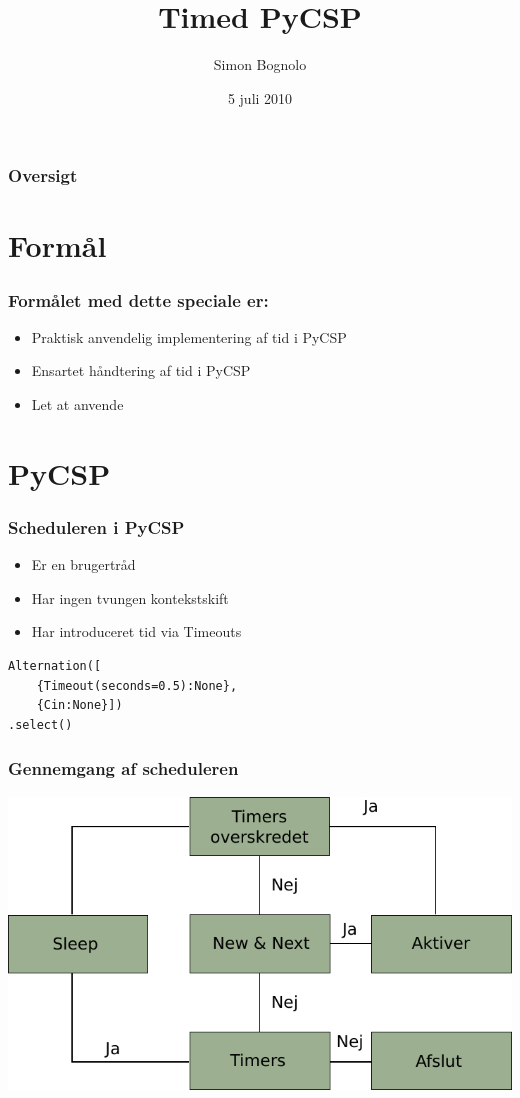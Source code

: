\documentclass[12pt]{beamer}
\title
{Timed PyCSP}
\institute
{Datalogisk Institut \\ Københavns Universitet}
\author
{Simon Bognolo}
\date
{5 juli 2010}
\begin{document}
\frame[plain]\titlepage
 
\begin{frame}
  \frametitle{Oversigt}
  \tableofcontents
\end{frame}

\section{Formål}
\begin{frame}
  \frametitle{Formålet med dette speciale er:}
  \begin{itemize}
	\item Praktisk anvendelig implementering af tid i PyCSP
	\item Ensartet håndtering af tid i PyCSP
	\item Let at anvende
  \end{itemize}
\end{frame}

 
\section{PyCSP}
\begin{frame} [fragile]
  \frametitle{Scheduleren i PyCSP}
  \begin{itemize}
	\item Er en brugertråd
	\item Har ingen tvungen kontekstskift
	\item Har introduceret tid via Timeouts
  \end{itemize}
\begin{lstlisting}
Alternation([
    {Timeout(seconds=0.5):None}, 
    {Cin:None}])
.select()
\end{lstlisting}
\end{frame}

\begin{frame}
  \frametitle{Gennemgang af scheduleren}
  \includegraphics[scale=0.9]{pycsp-scheduler} 
\end{frame}
\end{document}
